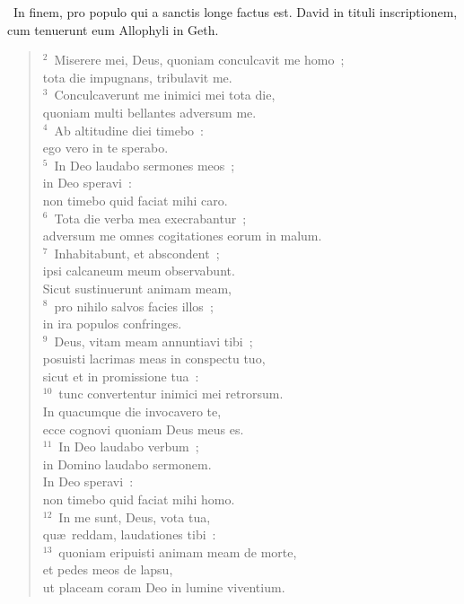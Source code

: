 ~\lettrine[lines=10,image=true,loversize=0.05,lraise=-0.03]{I}{}n finem, pro populo qui a sanctis longe factus est. David in tituli inscriptionem, cum tenuerunt eum Allophyli in Geth.
\begin{flushleft}\begin{verse}\vspace{6pt}${}^{2}$~Miserere mei, Deus, quoniam conculcavit me homo~;\\ tota die impugnans, tribulavit me.\\
${}^{3}$~Conculcaverunt me inimici mei tota die,\\ quoniam multi bellantes adversum me.\\
${}^{4}$~Ab altitudine diei timebo~:\\ ego vero in te sperabo.\\
${}^{5}$~In Deo laudabo sermones meos~;\\ in Deo speravi~:\\ non timebo quid faciat mihi caro.\\
${}^{6}$~Tota die verba mea execrabantur~;\\ adversum me omnes cogitationes eorum in malum.\\
${}^{7}$~Inhabitabunt, et abscondent~;\\ ipsi calcaneum meum observabunt.\\ Sicut sustinuerunt animam meam,\\
${}^{8}$~pro nihilo salvos facies illos~;\\ in ira populos confringes.\\
${}^{9}$~Deus, vitam meam annuntiavi tibi~;\\ posuisti lacrimas meas in conspectu tuo,\\ sicut et in promissione tua~:\\
${}^{10}$~tunc convertentur inimici mei retrorsum.\\ In quacumque die invocavero te,\\ ecce cognovi quoniam Deus meus es.\\
${}^{11}$~In Deo laudabo verbum~;\\ in Domino laudabo sermonem.\\ In Deo speravi~:\\ non timebo quid faciat mihi homo.\\
${}^{12}$~In me sunt, Deus, vota tua,\\ qu\ae\ reddam, laudationes tibi~:\\
${}^{13}$~quoniam eripuisti animam meam de morte,\\ et pedes meos de lapsu,\\ ut placeam coram Deo in lumine viventium.\end{verse}\end{flushleft}


